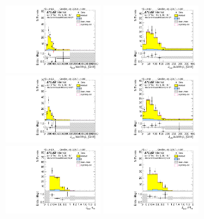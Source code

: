 \begin{figure}[htbp!]
\begin{center}
\includegraphics[width=0.32\textwidth,angle=-90]{figures/boosted/Control/b77_FourTag_Control_leadHCand_trk0_Pt.pdf}
\includegraphics[width=0.32\textwidth,angle=-90]{figures/boosted/Control/b77_FourTag_Control_leadHCand_trk1_Pt.pdf}\\
\includegraphics[width=0.32\textwidth,angle=-90]{figures/boosted/Control/b77_FourTag_Control_sublHCand_trk0_Pt.pdf}
\includegraphics[width=0.32\textwidth,angle=-90]{figures/boosted/Control/b77_FourTag_Control_sublHCand_trk1_Pt.pdf}\\
\includegraphics[width=0.32\textwidth,angle=-90]{figures/boosted/Control/b77_FourTag_Control_leadHCand_trk_dr.pdf}
\includegraphics[width=0.32\textwidth,angle=-90]{figures/boosted/Control/b77_FourTag_Control_sublHCand_trk_dr.pdf}

\end{center}
\end{figure}
